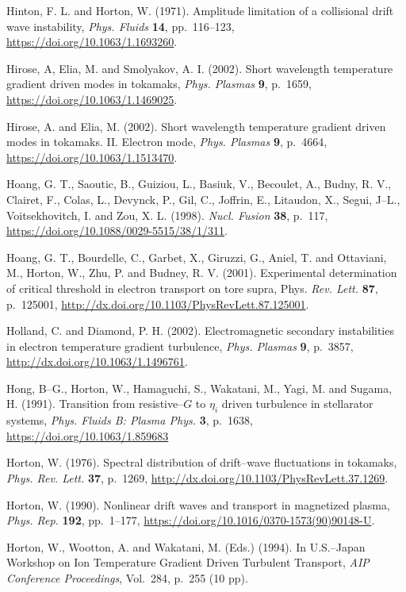 \documentclass[a4paper,openany,12pt]{book}
\begin{document}
{\begin{thebibliography}{100}
\bibitem{}
Hinton, F. L. and Horton, W. (1971). Amplitude limitation of a collisional drift wave instability, \emph{Phys. Fluids} \textbf{14}, pp.~116--123, \url{https://doi.org/10.1063/1.1693260}.

\bibitem{}
Hirose, A, Elia, M. and Smolyakov, A. I. (2002). Short wavelength temperature gradient driven modes in tokamaks, \emph{Phys. Plasmas} \textbf{9}, p.~1659, \url{https://doi.org/10.1063/1.1469025}.

\bibitem{}
Hirose, A. and Elia, M. (2002). Short wavelength temperature gradient driven modes in tokamaks. II. Electron mode, \emph{Phys. Plasmas} \textbf{9}, p.~4664, \url{https://doi.org/10.1063/1.1513470}.

\bibitem{}
Hoang, G. T., Saoutic, B., Guiziou, L., Basiuk, V., Becoulet, A., Budny, R. V., Clairet, F., Colas, L., Devynck, P., Gil, C., Joffrin, E., Litaudon, X., Segui, J--L., Voitsekhovitch, I. and Zou, X. L. (1998). {\em Nucl. Fusion} \textbf{38}, p.~117, 
\url{https://doi.org/10.1088/0029-5515/38/1/311}.

\bibitem{}
Hoang, G. T., Bourdelle, C., Garbet, X., Giruzzi, G., Aniel, T. and Ottaviani, M., Horton, W., Zhu, P. and Budney, R. V. (2001). Experimental determination of critical threshold in electron transport on tore supra, Phys. \emph{Rev. Lett.} \textbf{87}, p.~125001, \url{http://dx.doi.org/10.1103/PhysRevLett.87.125001}. 

\bibitem{}
Holland, C. and Diamond, P. H. (2002). Electromagnetic secondary instabilities in electron temperature gradient turbulence, \emph{Phys. Plasmas} \textbf{9}, p.~3857, \url{http://dx.doi.org/10.1063/1.1496761}.

\bibitem{}
Hong, B--G., Horton, W., Hamaguchi, S., Wakatani, M., Yagi, M. and Sugama, H. (1991). Transition from resistive--$G$ to $\eta_i$ driven turbulence in stellarator systems, \emph{Phys. Fluids B: Plasma Phys.} \textbf{3}, p.~1638, 
\url{https://doi.org/10.1063/1.859683}

\bibitem{}
Horton, W. (1976). Spectral distribution of drift--wave fluctuations in tokamaks, \emph{Phys. Rev. Lett.} \textbf{37}, p.~1269, \url{http://dx.doi.org/10.1103/PhysRevLett.37.1269}.

\bibitem{}
Horton, W. (1990). Nonlinear drift waves and transport in magnetized plasma, \emph{Phys. Rep.} \textbf{192}, 
pp.~1--177, \url{https://doi.org/10.1016/0370-1573(90)90148-U}.

\bibitem{}
Horton, W.,  Wootton, A. and Wakatani, M. (Eds.) (1994).
 In U.S.--Japan Workshop on Ion Temperature Gradient Driven
 Turbulent Transport, {\em AIP Conference Proceedings}, Vol.~284, p.~255 (10 pp).


\end{thebibliography}}
\end{document}
